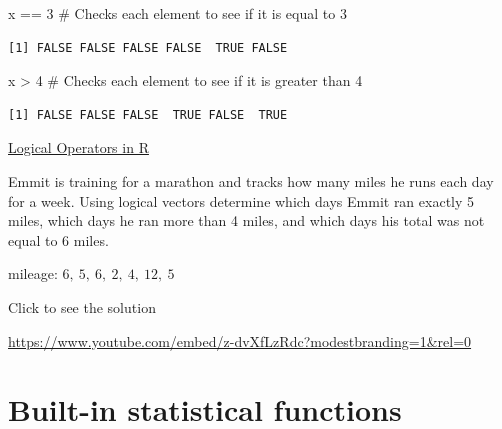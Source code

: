 \documentclass[
  letterpaper,
  DIV=11,
  numbers=noendperiod]{scrreprt}
\newenvironment{Shaded}{\begin{snugshade}}{\end{snugshade}}
\newcommand{\CommentTok}[1]{\textcolor[rgb]{0.37,0.37,0.37}{#1}}
\newcommand{\DecValTok}[1]{\textcolor[rgb]{0.68,0.00,0.00}{#1}}
\newcommand{\NormalTok}[1]{\textcolor[rgb]{0.00,0.23,0.31}{#1}}
\newcommand{\SpecialCharTok}[1]{\textcolor[rgb]{0.37,0.37,0.37}{#1}}
\begin{document}
\begin{Shaded}
\begin{Highlighting}[]
\NormalTok{x }\SpecialCharTok{==} \DecValTok{3} \CommentTok{\# Checks each element to see if it is equal to 3}
\end{Highlighting}
\end{Shaded}

\begin{verbatim}
[1] FALSE FALSE FALSE FALSE  TRUE FALSE
\end{verbatim}

\begin{Shaded}
\begin{Highlighting}[]
\NormalTok{x }\SpecialCharTok{\textgreater{}} \DecValTok{4} \CommentTok{\# Checks each element to see if it is greater than 4}
\end{Highlighting}
\end{Shaded}

\begin{verbatim}
[1] FALSE FALSE FALSE  TRUE FALSE  TRUE
\end{verbatim}

\begin{watch}{}{}
    \href{https://youtu.be/IKVtf3-yO3k}{Logical Operators in R}
\end{watch}

\begin{tcolorbox}[enhanced jigsaw, leftrule=.75mm, arc=.35mm, coltitle=black, rightrule=.15mm, bottomrule=.15mm, toprule=.15mm, left=2mm, colbacktitle=quarto-callout-tip-color!10!white, title=\textcolor{quarto-callout-tip-color}{\faLightbulb}\hspace{0.5em}{Try it Out}, toptitle=1mm, breakable, colframe=quarto-callout-tip-color-frame, bottomtitle=1mm, titlerule=0mm, colback=white, opacityback=0, opacitybacktitle=0.6]

Emmit is training for a marathon and tracks how many miles he runs each
day for a week. Using logical vectors determine which days Emmit ran
exactly 5 miles, which days he ran more than 4 miles, and which days his
total was not equal to 6 miles.

mileage: \(6,\ 5,\ 6,\ 2,\ 4,\ 12,\ 5\)

Click to see the solution

\url{https://www.youtube.com/embed/z-dvXfLzRdc?modestbranding=1&rel=0}

\end{tcolorbox}

\section{Built-in statistical
functions}\label{built-in-statistical-functions}
\end{document}
